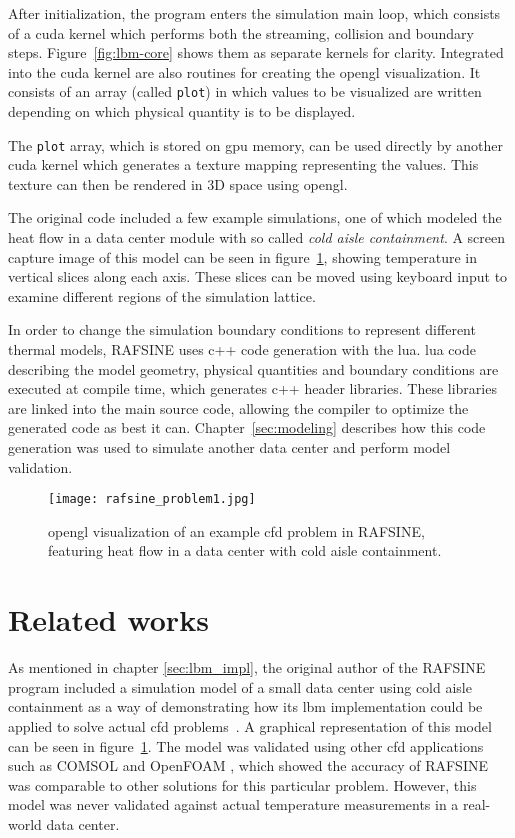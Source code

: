 After initialization, the program enters the simulation main loop, which consists of a \gls{cuda} kernel which performs both the streaming, collision and boundary steps. Figure~\ref{fig:lbm-core} shows them as separate kernels for clarity. Integrated into the \gls{cuda} kernel are also routines for creating the \gls{opengl} visualization. It consists of an array (called \texttt{plot}) in which values to be visualized are written depending on which physical quantity is to be displayed.

The \texttt{plot} array, which is stored on \gls{gpu} memory, can be used directly by another \gls{cuda} kernel which generates a texture mapping representing the values. This texture can then be rendered in 3D space using \gls{opengl}.

The original code included a few example simulations, one of which modeled the heat flow in a data center module with so called \textit{cold aisle containment}. A screen capture image of this model can be seen in figure~\ref{fig:problem2}, showing temperature in vertical slices along each axis. These slices can be moved using keyboard input to examine different regions of the simulation lattice.

In order to change the simulation boundary conditions to represent different thermal models, RAFSINE uses \gls{c++} code generation with the \gls{lua}. \gls{lua} code describing the model geometry, physical quantities and boundary conditions are executed at compile time, which generates \gls{c++} header libraries. These libraries are linked into the main source code, allowing the compiler to optimize the generated code as best it can. Chapter~\ref{sec:modeling} describes how this code generation was used to simulate another data center and perform model validation.

\begin{figure}[ht]
\begin{center}
\texttt{[image: rafsine\_problem1.jpg]}
\end{center}
\caption{\gls{opengl} visualization of an example \gls{cfd} problem in RAFSINE, featuring heat flow in a data center with cold aisle containment.\label{ch2:fig1}}
\label{fig:problem2}
\end{figure}

\clearpage

\section{Related works}\label{sec:related_works}
As mentioned in chapter \ref{sec:lbm_impl}, the original author of the RAFSINE program included a simulation model of a small data center using cold aisle containment as a way of demonstrating how its \gls{lbm} implementation could be applied to solve actual \gls{cfd} problems~\cites[pg.163]{Delbosc}. A graphical representation of this model can be seen in figure~\ref{fig:problem2}. The model was validated using other \gls{cfd} applications such as COMSOL and OpenFOAM \cites[pg.170]{Delbosc}, which showed the accuracy of RAFSINE was comparable to other solutions for this particular problem. However, this model was never validated against actual temperature measurements in a real-world data center.

